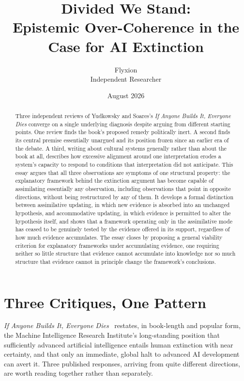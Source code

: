\documentclass[11pt]{article}
\title{Divided We Stand: \\ Epistemic Over-Coherence in the Case for AI Extinction}
\author{Flyxion \\ \small Independent Researcher}
\date{August 2026}
\begin{document}
\maketitle

\begin{abstract}
Three independent reviews of Yudkowsky and Soares's \emph{If Anyone Builds It, Everyone Dies} converge on a single underlying diagnosis despite arguing from different starting points. One review finds the book's proposed remedy politically inert. A second finds its central premise essentially unargued and its position frozen since an earlier era of the debate. A third, writing about cultural systems generally rather than about the book at all, describes how excessive alignment around one interpretation erodes a system's capacity to respond to conditions that interpretation did not anticipate. This essay argues that all three observations are symptoms of one structural property: the explanatory framework behind the extinction argument has become capable of assimilating essentially any observation, including observations that point in opposite directions, without being restructured by any of them. It develops a formal distinction between assimilative updating, in which new evidence is absorbed into an unchanged hypothesis, and accommodative updating, in which evidence is permitted to alter the hypothesis itself, and shows that a framework operating only in the assimilative mode has ceased to be genuinely tested by the evidence offered in its support, regardless of how much evidence accumulates. The essay closes by proposing a general viability criterion for explanatory frameworks under accumulating evidence, one requiring neither so little structure that evidence cannot accumulate into knowledge nor so much structure that evidence cannot in principle change the framework's conclusions.
\end{abstract}

\section{Three Critiques, One Pattern}

\emph{If Anyone Builds It, Everyone Dies}~\cite{yudkowskysoares2025} restates, in book-length and popular form, the Machine Intelligence Research Institute's long-standing position that sufficiently advanced artificial intelligence entails human extinction with near certainty, and that only an immediate, global halt to advanced AI development can avert it. Three published responses, arriving from quite different directions, are worth reading together rather than separately.
\end{document}
